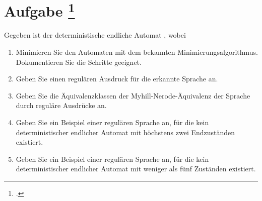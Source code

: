 \documentclass{lehramt-informatik-aufgabe}
\begin{document}
\section{Aufgabe
\footcite{66115:2016:09}}

Gegeben ist der deterministische endliche Automat ,
wobei

\begin{enumerate}
\item Minimieren Sie den Automaten mit dem bekannten
Minimierungsalgorithmus. Dokumentieren Sie die Schritte geeignet.

\item Geben Sie einen regulären Ausdruck für die erkannte Sprache an.

\item Geben Sie die Äquivalenzklassen der Myhill-Nerode-Äquivalenz der
Sprache durch reguläre Ausdrücke an.

\item Geben Sie ein Beispiel einer regulären Sprache an, für die kein
deterministischer endlicher Automat mit höchstens zwei Endzuständen
existiert.

\item Geben Sie ein Beispiel einer regulären Sprache an, für die kein
deterministischer endlicher Automat mit weniger als fünf Zuständen
existiert.
\end{enumerate}
\end{document}
